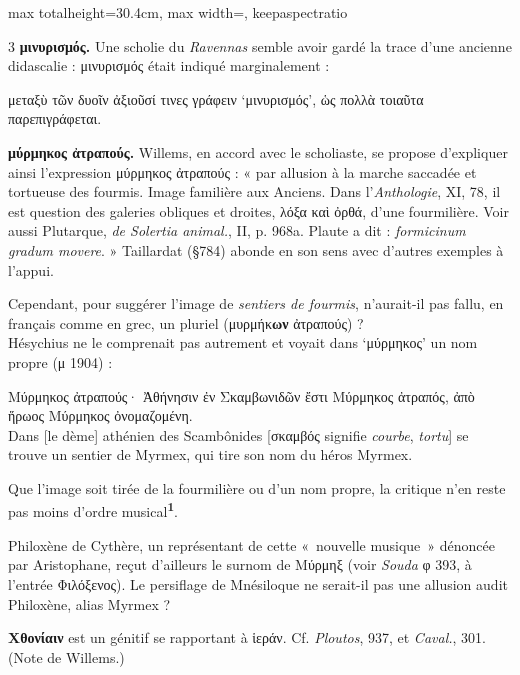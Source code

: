 \documentclass[11pt,twoside]{book}
\newcommand{\italique}[1]{\textit{#1}}
\newcommand{\citComm}[1]{\begin{quoting}[vskip=0.4pt,leftmargin=0.7em,rightmargin=0.2em]#1\end{quoting}}
\newcommand{\francais}[1]{{\policeFr #1}}
\newcommand{\latin}[1]{\textit{#1}}
\newcommand{\marqueur}[1]{\textsuperscript{\color{rubricRed}\textbf{#1}}}
\begin{document}
\begin{adjustbox}{max totalheight=30.4cm, max width=\textwidth, keepaspectratio}
\begin{minipage}{\textwidth}
{\fontsize{5.9pt}{6.7pt}\selectfont\begin{multicols}{3}
 \textbf{μινυρισμός.} Une scholie du \italique{Ravennas} semble avoir gardé la trace d'une ancienne didascalie : μινυρισμός était indiqué marginalement :
\citComm{μεταξὺ τῶν δυοῖν ἀξιοῦσί τινες γράφειν `μινυρισμός', ὡς πολλὰ τοιαῦτα παρεπιγράφεται.}
\par\vspace{1.5pt}
 \textbf{μύρμηκος ἀτραπούς.} Willems, en accord avec le scholiaste, se propose d'expliquer ainsi l'expression μύρμηκος ἀτραπούς : « par allusion à la marche saccadée et tortueuse des fourmis. Image familière aux Anciens. Dans l'\italique{Anthologie}, XI, 78, il est question des galeries obliques et droites, λόξα καὶ ὀρθά, d'une fourmilière. Voir aussi Plutarque, \italique{de Solertia animal.}, II, p. 968a. Plaute a dit : \latin{formicinum gradum movere}. » Taillardat (§784) abonde en son sens avec d'autres exemples à l'appui.
\par\vspace{1.5pt}
\noindent Cependant, pour suggérer l'image de \italique{sentiers de fourmis}, n'aurait-il pas fallu, en français comme en grec, un pluriel (μυρμήκ\textbf{ων} ἀτραπούς) ?\\ Hésychius ne le comprenait pas autrement et voyait dans `μύρμηκος' un nom propre (μ 1904) :
\citComm{Μύρμηκος ἀτραπούς· Ἀθήνησιν ἐν Σκαμβωνιδῶν ἔστι Μύρμηκος ἀτραπός, ἀπὸ ἥρωος Μύρμηκος ὀνομαζομένη.\\
\francais{Dans [le dème] athénien des Scambônides [σκαμβός signifie \italique{courbe}, \italique{tortu}] se trouve un sentier de Myrmex, qui tire son nom du héros Myrmex.}}
\par\vspace{1.5pt}
\noindent Que l'image soit tirée de la fourmilière ou d'un nom propre, la critique n'en reste pas moins d'ordre musical\marqueur{1}.
\par\vspace{1.5pt}
\noindent Philoxène de Cythère, un représentant de cette «~nouvelle musique~» dénoncée par Aristophane, reçut d'ailleurs le surnom de Μύρμηξ (voir \italique{Souda} φ 393, à l'entrée Φιλόξενος). Le persiflage de Mnésiloque ne serait-il pas une allusion audit Philoxène, alias Myrmex ?
\par\vspace{1.5pt}
 \textbf{Χθονίαιν} est un génitif se rapportant à ἱεράν. Cf. \italique{Ploutos}, 937, et \italique{Caval.}, 301. (Note de Willems.)

\end{multicols}}
\end{minipage}
\end{adjustbox}
\end{document}

